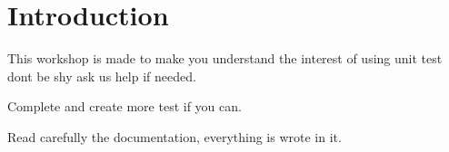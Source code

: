 \hypertarget{index_intro_sec}{}\section{Introduction}\label{index_intro_sec}
This workshop is made to make you understand the interest of using unit test don\textquotesingle{}t be shy ask us help if needed.

Complete and create more test if you can.

Read carefully the documentation, everything is wrote in it. 